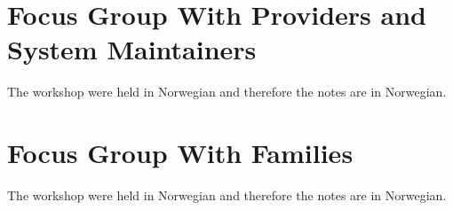 \section{Focus Group With Providers and System Maintainers}
\label{workshop_with_providers_and_system_maintainers_appendix}
The workshop were held in Norwegian and therefore the notes are in Norwegian.





\section{Focus Group With Families}
\label{workshop_with_families_appendix}
The workshop were held in Norwegian and therefore the notes are in Norwegian.











\clearpage